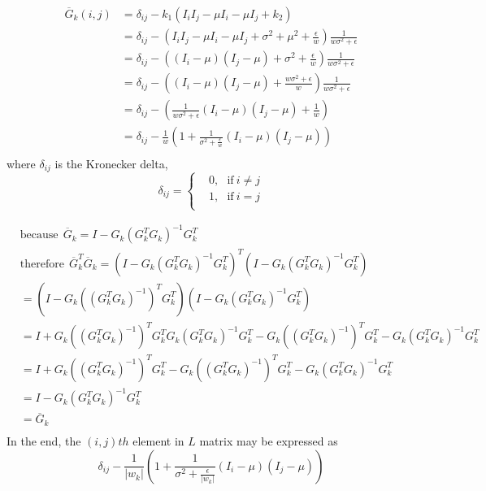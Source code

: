 \documentclass[journal]{IEEEtran}
\begin{document}
\begin{equation}
    \begin{aligned}
        \overline{G}_{k}(i,j) &= \delta_{ij} - k_{1} (I_{i}I_{j} - \mu I_{i} - \mu I_{j} + k_2) \\
            &= \delta_{ij} - (I_{i}I_{j} - \mu I_{i} - \mu I_{j} + \sigma^2 + \mu^2 + \frac{\epsilon}{w}) \frac{1}{w\sigma^2 + \epsilon} \\ 
            &= \delta_{ij} - ((I_i - \mu)(I_j - \mu) + \sigma^2 + \frac{\epsilon}{w}) \frac{1}{w\sigma^2 + \epsilon} \\ 
            &= \delta_{ij} - ((I_i - \mu)(I_j - \mu) + \frac{w\sigma^2 + \epsilon}{w}) \frac{1}{w\sigma^2 + \epsilon} \\
            &= \delta_{ij} - (\frac{1}{w\sigma^2 + \epsilon}(I_i - \mu)(I_j - \mu) + \frac{1}{w}) \\
            &= \delta_{ij} - \frac{1}{w}(1 + \frac{1}{\sigma^2 + \frac{\epsilon}{w}}(I_{i}-\mu)(I_{j}-\mu)) \\
    \end{aligned}
    \label{equ26}
\end{equation}
where $\delta_{ij}$ is the Kronecker delta, 
\begin{equation}
    \delta_{ij} = \left \{
        \begin{aligned}
            &0,~~~\text{if}~i \neq j \\
            &1,~~~\text{if}~i = j \\
        \end{aligned}
    \right .
    \label{equ27}
\end{equation}

\begin{equation}
    \begin{aligned}
        &\text{because}~~\overline{G}_k = I - G_k (G_k^T G_k)^{-1} G_k^T \\
        &\text{therefore}~~\overline{G}_k^T \overline{G}_k = (I - G_k (G_k^T G_k)^{-1} G_k^T)^{T}(I - G_k (G_k^T G_k)^{-1} G_k^T) \\
        &= (I - G_k ((G_k^T G_k)^{-1})^T G_k^T)(I - G_k (G_k^T G_k)^{-1} G_k^T) \\
        &= I + G_k ((G_k^T G_k)^{-1})^T G_k^T G_k (G_k^T G_k)^{-1} G_k^T - G_k ((G_k^T G_k)^{-1})^T G_k^T - G_k (G_k^T G_k)^{-1} G_k^T \\
        &= I + G_k ((G_k^T G_k)^{-1})^T G_k^T - G_k ((G_k^T G_k)^{-1})^T G_k^T - G_k (G_k^T G_k)^{-1} G_k^T \\
        &= I - G_k (G_k^T G_k)^{-1} G_k^T \\
        &= \overline{G}_k \\
    \end{aligned}
    \label{equ28}
\end{equation}
In the end, the $(i,j)th$ element in $L$ matrix may be expressed as 
\begin{equation}
    \delta_{ij} - \frac{1}{|w_{k}|}(1 + \frac{1}{\sigma^2 + \frac{\epsilon}{|w_k|}}(I_{i}-\mu)(I_{j}-\mu))
    \label{equ29}
\end{equation}


\end{document}
